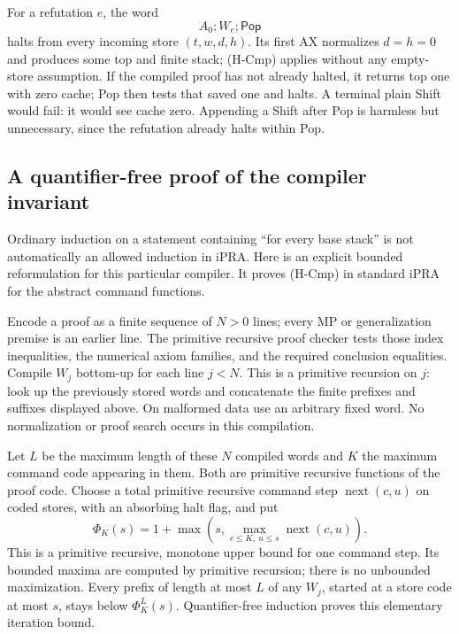 For a refutation $e$, the word
\[
                        A_0;W_e;\mathsf{Pop}               \tag{H-Ref}
\]
halts from every incoming store $(t,w,d,h)$. Its first AX normalizes
$d=h=0$ and produces some top and finite stack; (H-Cmp) applies
without any empty-store assumption. If the compiled proof has not
already halted, it returns top one with zero cache; Pop then tests
that saved one and halts. A terminal plain Shift would fail: it
would see cache zero. Appending a Shift after Pop is harmless but
unnecessary, since the refutation already halts within Pop.

\subsection{A quantifier-free proof of the compiler invariant}

Ordinary induction on a statement containing ``for every base
stack'' is not automatically an allowed induction in iPRA. Here is
an explicit bounded reformulation for this particular compiler.
It proves (H-Cmp) in standard iPRA for the abstract command functions.

Encode a proof as a finite sequence of $N>0$ lines; every MP or
generalization premise is an earlier line. The primitive recursive
proof checker tests those index inequalities, the numerical axiom
families, and the required conclusion equalities. Compile $W_j$
bottom-up for each line $j<N$. This is a primitive recursion on
$j$: look up the previously stored words and concatenate the finite
prefixes and suffixes displayed above. On malformed data use an
arbitrary fixed word. No normalization or proof search occurs in
this compilation.

Let $L$ be the maximum length of these $N$ compiled words and $K$
the maximum command code appearing in them. Both are primitive
recursive functions of the proof code. Choose a total primitive
recursive command step $\operatorname{next}(c,u)$ on coded stores,
with an absorbing halt flag, and put
\[
 \Phi_K(s)=1+\max\left(s,
    \max_{c\le K,\ u\le s}\operatorname{next}(c,u)\right).
\]
This is a primitive recursive, monotone upper bound for one command
step. Its bounded maxima are computed by primitive recursion; there
is no unbounded maximization. Every prefix of length at most $L$ of
any $W_j$, started at a store code at most $s$, stays below
$\Phi_K^L(s)$. Quantifier-free induction proves this elementary
iteration bound.


